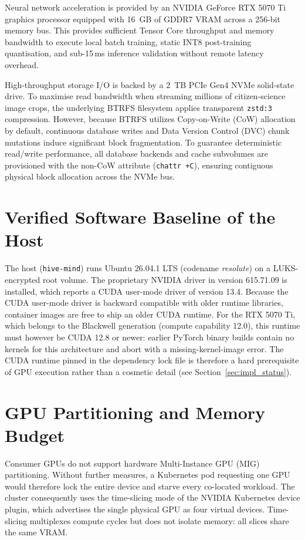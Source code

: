 Neural network acceleration is provided by an NVIDIA GeForce RTX 5070 Ti graphics processor equipped with 16~GB of GDDR7 VRAM across a 256-bit memory bus. This provides sufficient Tensor Core throughput and memory bandwidth to execute local batch training, static INT8 post-training quantisation, and sub-15\,ms inference validation without remote latency overhead.

High-throughput storage I/O is backed by a 2~TB PCIe Gen4 NVMe solid-state drive. To maximise read bandwidth when streaming millions of citizen-science image crops, the underlying BTRFS filesystem applies transparent \texttt{zstd:3} compression. However, because BTRFS utilizes Copy-on-Write (CoW) allocation by default, continuous database writes and Data Version Control (DVC) chunk mutations induce significant block fragmentation. To guarantee deterministic read/write performance, all database backends and cache subvolumes are provisioned with the non-CoW attribute (\texttt{chattr +C}), ensuring contiguous physical block allocation across the NVMe bus.

\section{Verified Software Baseline of the Host}
\label{sec:host_baseline}

The host (\texttt{hive-mind}) runs Ubuntu 26.04.1 LTS (codename \textit{resolute}) on a LUKS-encrypted root volume. The proprietary NVIDIA driver in version 615.71.09 is installed, which reports a CUDA user-mode driver of version 13.4. Because the CUDA user-mode driver is backward compatible with older runtime libraries, container images are free to ship an older CUDA runtime. For the RTX 5070 Ti, which belongs to the Blackwell generation (compute capability 12.0), this runtime must however be CUDA 12.8 or newer: earlier PyTorch binary builds contain no kernels for this architecture and abort with a missing-kernel-image error. The CUDA runtime pinned in the dependency lock file is therefore a hard prerequisite of GPU execution rather than a cosmetic detail (see Section~\ref{sec:impl_status}).

\section{GPU Partitioning and Memory Budget}
\label{sec:gpu_partitioning}

Consumer GPUs do not support hardware Multi-Instance GPU (MIG) partitioning. Without further measures, a Kubernetes pod requesting one GPU would therefore lock the entire device and starve every co-located workload. The cluster consequently uses the time-slicing mode of the NVIDIA Kubernetes device plugin, which advertises the single physical GPU as four virtual devices. Time-slicing multiplexes compute cycles but does not isolate memory: all slices share the same VRAM.


